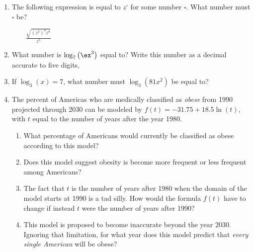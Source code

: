 \begin{enumerate}

    \item 
        
        The following expression is equal to \(z^\square\)
        for some number \(\square\).
        What number must \(\square\) be?

        \(\displaystyle \qquad\frac{\sqrt{\left(z^3\right)^3z^8}}{z^5} \)
        \vfill\null

    \item 
        What number is \(\log_7\left(\ex^3\right)\) equal to?
        Write this number as a decimal accurate to five digits,
        \vfill\null

    \item 
        If \(\log_3(x) = 7\), 
        what number must \(\log_3\left(81x^2\right)\) be equal to?
        \vfill\null
        \vfill\null

        \newpage

    \item 
        The percent of Americas who are medically classified as \emph{obese}
        from 1990 projected through 2030 can be modeled
        by \(f(t) = -31.75 + 18.5 \ln(t)\), 
        with \(t\) equal to the number of years after the year 1980.
        \begin{enumerate}
            \item
                What percentage of Americans would currently be classified as obese
                according to this model?
                \vfill
            \item
                Does this model suggest obesity is become more frequent
                or less frequent among Americans?
                \vfill
            \item
                The fact that \(t\) is the number of years after 1980
                when the domain of the model starts at 1990 is a tad silly.
                How would the formula \(f(t)\) have to change
                if instead \(t\) were the number of years after 1990?
                \vfill
            \item
                This model is proposed to become inaccurate beyond the year 2030.
                Ignoring that limitation,
                for what year does this model predict
                that \emph{every single American} will be obese?
                \vfill
                \vfill
        \end{enumerate}

\end{enumerate}



